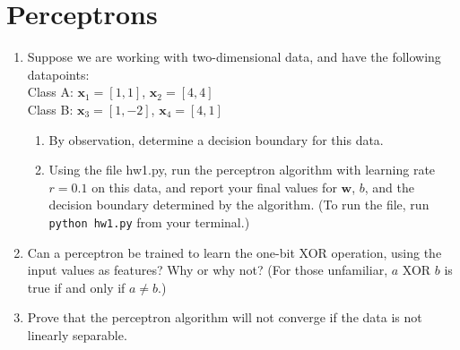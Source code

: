 \documentclass{article}
\begin{document}
\section{Perceptrons}
\begin{enumerate}[label=\arabic*.]
\item Suppose we are working with two-dimensional data, and have the following datapoints: \\
Class A: $\mathbf{x}_1 = [1, 1]$, $\mathbf{x}_2 = [4, 4]$ \\
Class B: $\mathbf{x}_3 = [1, -2]$, $\mathbf{x}_4 = [4, 1]$ 
	  \begin{enumerate}[label=(\alph*)]
	  \item By observation, determine a decision boundary for this data.
	  \item Using the file hw1.py, run the perceptron algorithm with learning rate $r = 0.1$ on this data, and report your final values for $\mathbf{w}$, $b$, and the decision boundary determined by the algorithm. (To run the file, run \verb|python hw1.py| from your terminal.)
	  \end{enumerate}
\item Can a perceptron be trained to learn the one-bit XOR operation, using the input values as features? Why or why not? (For those unfamiliar, $a$ XOR $b$ is true if and only if $a \neq b$.) 
\item Prove that the perceptron algorithm will not converge if the data is not linearly separable.
\end{enumerate}
\end{document}
